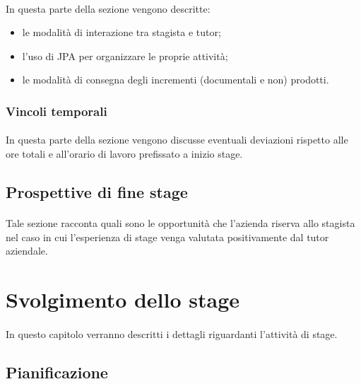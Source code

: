 \documentclass[
article,
10pt, %
oneside, %
BCOR5mm, %
]{scrartcl}
\begin{document}
\paragraph{} In questa parte della sezione vengono descritte:

\begin{itemize}
\item le modalità di interazione tra stagista e tutor;
\item l'uso di JPA per organizzare le proprie attività;
\item le modalità di consegna degli incrementi (documentali e non) prodotti.
\end{itemize}

\subsubsection{Vincoli temporali}

\paragraph{} In questa parte della sezione vengono discusse eventuali
deviazioni rispetto alle ore totali e all'orario di lavoro prefissato a inizio
stage.

\subsection{Prospettive di fine stage}

\paragraph{} Tale sezione racconta quali sono le opportunità che l'azienda
riserva allo stagista nel caso in cui l'esperienza di stage venga valutata
positivamente dal tutor aziendale.



\section{Svolgimento dello stage} %

\paragraph{} In questo capitolo verranno descritti i dettagli riguardanti
l'attività di stage.

\subsection{Pianificazione}
\end{document}
